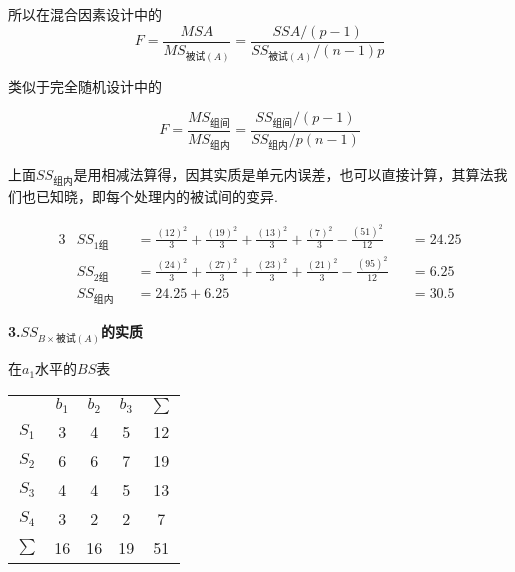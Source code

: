 所以在混合因素设计中的
\[ F=\frac{MSA}{MS_{\text{被试}\left( A \right)}}=\frac{SSA/\left( p-1 \right)}{SS_{\text{被试}\left( A \right)}/\left( n-1 \right) p} \]

类似于完全随机设计中的

\[ F=\frac{MS_{\text{组间}}}{MS_{\text{组内}}}=\frac{SS_{\text{组间}}/\left( p-1 \right)}{SS_{\text{组内}}/p\left( n-1 \right)} \]

上面$SS_{\text{组内}}$是用相减法算得，因其实质是单元内误差，也可以直接计算，其算法我们也已知晓，即每个处理内的被试间的变异.

\begin{alignat*}{3}
    &    SS_{\text{1组}}    &&=    \frac{\left( 12 \right) ^2}{3}+\frac{\left( 19 \right) ^2}{3}+\frac{\left( 13 \right) ^2}{3}+\frac{\left( 7 \right) ^2}{3}-\frac{\left( 51 \right) ^2}{12}    &&=    24.25\\
    &    SS_{\text{2组}}    &&=    \frac{\left( 24 \right) ^2}{3}+\frac{\left( 27 \right) ^2}{3}+\frac{\left( 23 \right) ^2}{3}+\frac{\left( 21 \right) ^2}{3}-\frac{\left( 95 \right) ^2}{12}    &&=    6.25\\
    &    SS_{\text{组内}}    &&=24.25+6.25                                    &&=    30.5
\end{alignat*}

\textbf{3.$SS_{B\times \text{被试}\left( A \right)}$的实质}



\begin{margintable}
  \centering
  \caption{在$a_1$水平的$BS$表}
    \begin{tabular}{ccccc}
          & $b_1$ & $b_2$ & $b_3$ & $\sum$ \\
    $S_1$ & \cellcolor[rgb]{ .886,  .937,  .855}3 & \cellcolor[rgb]{ .886,  .937,  .855}4 & \cellcolor[rgb]{ .886,  .937,  .855}5 & \cellcolor[rgb]{ 1,  .949,  .8}12 \\
    $S_2$ & \cellcolor[rgb]{ .886,  .937,  .855}6 & \cellcolor[rgb]{ .886,  .937,  .855}6 & \cellcolor[rgb]{ .886,  .937,  .855}7 & \cellcolor[rgb]{ 1,  .949,  .8}19 \\
    $S_3$ & \cellcolor[rgb]{ .886,  .937,  .855}4 & \cellcolor[rgb]{ .886,  .937,  .855}4 & \cellcolor[rgb]{ .886,  .937,  .855}5 & \cellcolor[rgb]{ 1,  .949,  .8}13 \\
    $S_4$ & \cellcolor[rgb]{ .886,  .937,  .855}3 & \cellcolor[rgb]{ .886,  .937,  .855}2 & \cellcolor[rgb]{ .886,  .937,  .855}2 & \cellcolor[rgb]{ 1,  .949,  .8}7 \\
    $\sum$ & \cellcolor[rgb]{ .929,  .929,  .929}16 & \cellcolor[rgb]{ .929,  .929,  .929}16 & \cellcolor[rgb]{ .929,  .929,  .929}19 & \cellcolor[rgb]{ .867,  .922,  .969}51 \\
    \end{tabular}%
\end{margintable}



